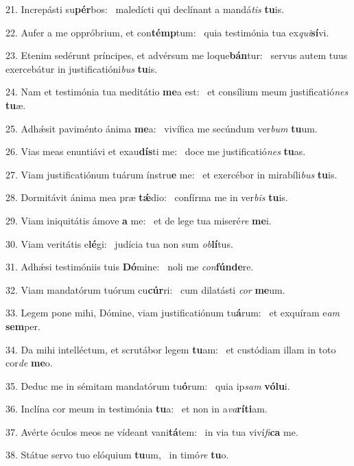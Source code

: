21. Increpásti su\textbf{pér}bos: \ast\  maledícti qui declínant a mandá\textit{tis} \textbf{tu}is.\

22. Aufer a me oppróbrium, et con\textbf{témp}tum: \ast\  quia testimónia tua ex\textit{qui}\textbf{sí}vi.\

23. Etenim sedérunt príncipes, et advérsum me loque\textbf{bán}tur: \ast\  servus autem tuus exercebátur in justificatióni\textit{bus} \textbf{tu}is.\

24. Nam et testimónia tua meditátio \textbf{me}a est: \ast\  et consílium meum justificatió\textit{nes} \textbf{tu}æ.\

25. Adhǽsit paviménto ánima \textbf{me}a: \ast\  vivífica me secúndum ver\textit{bum} \textbf{tu}um.\

26. Vias meas enuntiávi et exau\textbf{dís}ti me: \ast\  doce me justificatió\textit{nes} \textbf{tu}as.\

27. Viam justificatiónum tuárum ínstru\textbf{e} me: \ast\  et exercébor in mirabíli\textit{bus} \textbf{tu}is.\

28. Dormitávit ánima mea præ \textbf{tǽ}dio: \ast\  confírma me in ver\textit{bis} \textbf{tu}is.\

29. Viam iniquitátis ámove \textbf{a} me: \ast\  et de lege tua miseré\textit{re} \textbf{me}i.\

30. Viam veritátis e\textbf{lé}gi: \ast\  judícia tua non sum \textit{ob}\textbf{lí}tus.\

31. Adhǽsi testimóniis tuis \textbf{Dó}mine: \ast\  noli me \textit{con}\textbf{fún}\textbf{de}re.\

32. Viam mandatórum tuórum cu\textbf{cúr}ri: \ast\  cum dilatásti \textit{cor} \textbf{me}um.\

33. Legem pone mihi, Dómine, viam justificatiónum tu\textbf{á}rum: \ast\  et exquíram e\textit{am} \textbf{sem}per.\

34. Da mihi intelléctum, et scrutábor legem \textbf{tu}am: \ast\  et custódiam illam in toto cor\textit{de} \textbf{me}o.\

35. Deduc me in sémitam mandatórum tu\textbf{ó}rum: \ast\  quia ip\textit{sam} \textbf{vó}\textbf{lu}i.\

36. Inclína cor meum in testimónia \textbf{tu}a: \ast\  et non in a\textit{va}\textbf{rí}\textbf{ti}am.\

37. Avérte óculos meos ne vídeant vani\textbf{tá}tem: \ast\  in via tua viví\textit{fi}\textbf{ca} me.\

38. Státue servo tuo elóquium \textbf{tu}um, \ast\  in timó\textit{re} \textbf{tu}o.\


